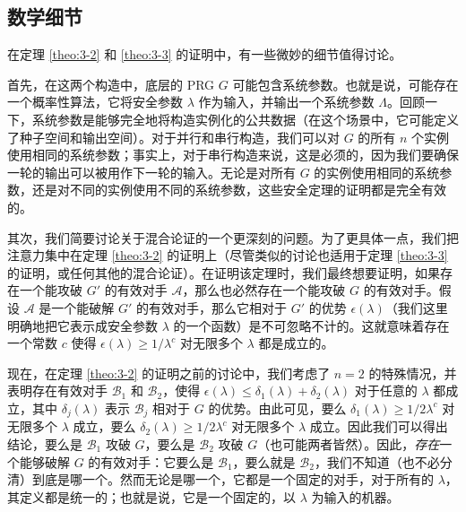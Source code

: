 \subsection{数学细节}\label{subsec:3-4-3}

在定理 \ref{theo:3-2} 和 \ref{theo:3-3} 的证明中，有一些微妙的细节值得讨论。

首先，在这两个构造中，底层的 PRG $G$ 可能包含系统参数。也就是说，可能存在一个概率性算法，它将安全参数 $\lambda$ 作为输入，并输出一个系统参数 $\Lambda$。回顾一下，系统参数是能够完全地将构造实例化的公共数据（在这个场景中，它可能定义了种子空间和输出空间）。对于并行和串行构造，我们可以对 $G$ 的所有 $n$ 个实例使用相同的系统参数；事实上，对于串行构造来说，这是必须的，因为我们要确保一轮的输出可以被用作下一轮的输入。无论是对所有 $G$ 的实例使用相同的系统参数，还是对不同的实例使用不同的系统参数，这些安全定理的证明都是完全有效的。

其次，我们简要讨论关于混合论证的一个更深刻的问题。为了更具体一点，我们把注意力集中在定理 \ref{theo:3-2} 的证明上（尽管类似的讨论也适用于定理 \ref{theo:3-3} 的证明，或任何其他的混合论证）。在证明该定理时，我们最终想要证明，如果存在一个能攻破 $G'$ 的有效对手 $\mathcal A$，那么也必然存在一个能攻破 $G$ 的有效对手。假设 $\mathcal A$ 是一个能破解 $G'$ 的有效对手，那么它相对于 $G'$ 的优势 $\epsilon(\lambda)$（我们这里明确地把它表示成安全参数 $\lambda$ 的一个函数）是不可忽略不计的。这就意味着存在一个常数 $c$ 使得 $\epsilon(\lambda)\geq{1}/{\lambda^c}$ 对无限多个 $\lambda$ 都是成立的。

现在，在定理 \ref{theo:3-2} 的证明之前的讨论中，我们考虑了 $n=2$ 的特殊情况，并表明存在有效对手 $\mathcal{B}_1$ 和 $\mathcal{B}_2$，使得 $\epsilon(\lambda)\leq\delta_1(\lambda)+\delta_2(\lambda)$ 对于任意的 $\lambda$ 都成立，其中 $\delta_j(\lambda)$ 表示 $\mathcal{B}_j$ 相对于 $G$ 的优势。由此可见，要么 $\delta_1(\lambda)\geq{1}/{2\lambda^c}$ 对无限多个 $\lambda$ 成立，要么 $\delta_2(\lambda)\geq{1}/{2\lambda^c}$ 对无限多个 $\lambda$ 成立。因此我们可以得出结论，要么是 $\mathcal{B}_1$ 攻破 $G$，要么是 $\mathcal{B}_2$ 攻破 $G$（也可能两者皆然）。因此，\emph{存在}一个能够破解 $G$ 的有效对手：它要么是 $\mathcal{B}_1$，要么就是 $\mathcal{B}_2$，我们不知道（也不必分清）到底是哪一个。然而无论是哪一个，它都是一个固定的对手，对于所有的 $\lambda$，其定义都是统一的；也就是说，它是一个固定的，以 $\lambda$ 为输入的机器。

